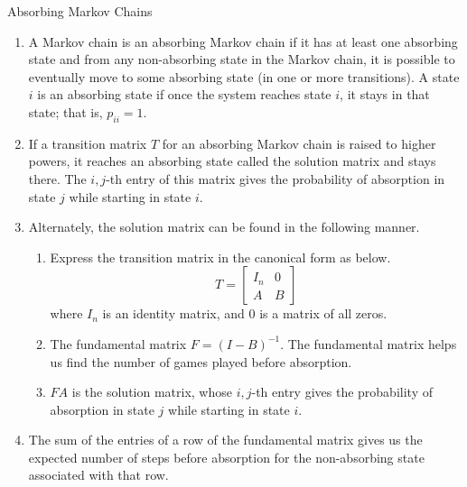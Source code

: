 \begin{summarybox}{Absorbing Markov Chains}
    \begin{enumerate}
        \item A Markov chain is an absorbing Markov chain if it has at least one absorbing state and from any non-absorbing state in the Markov chain, it is possible to eventually move to some absorbing state (in one or more transitions). A state \(i\) is an absorbing state if once the system reaches state \(i\), it stays in that state; that is, \(p_{ii} = 1\).
        \item If a transition matrix \(T\) for an absorbing Markov chain is raised to higher powers, it reaches an absorbing state called the solution matrix and stays there. The \(i, j\)-th entry of this matrix gives the probability of absorption in state \(j\) while starting in state \(i\).
        \item Alternately, the solution matrix can be found in the following manner.
              \begin{enumerate}
                  \item Express the transition matrix in the canonical form as below.
                        \[ T = \begin{bmatrix} I_n & 0 \\ A & B \end{bmatrix} \]
                        where \(I_n\) is an identity matrix, and \(0\) is a matrix of all zeros.
                  \item The fundamental matrix \(F = (I - B)^{-1}\). The fundamental matrix helps us find the number of games played before absorption.
                  \item \(FA\) is the solution matrix, whose \(i, j\)-th entry gives the probability of absorption in state \(j\) while starting in state \(i\).
              \end{enumerate}
        \item The sum of the entries of a row of the fundamental matrix gives us the expected number of steps before absorption for the non-absorbing state associated with that row.
    \end{enumerate}
\end{summarybox}